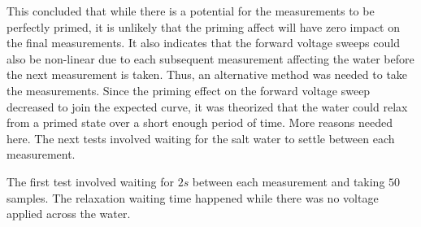 This concluded that while there is a potential for the measurements to be perfectly primed, it is unlikely that the priming affect will have zero impact on the final measurements.
It also indicates that the forward voltage sweeps could also be non-linear due to each subsequent measurement affecting the water before the next measurement is taken.
Thus, an alternative method was needed to take the measurements.    
Since the priming effect on the forward voltage sweep decreased to join the expected curve, it was theorized that the water could relax from a primed state over a short enough period of time.
More reasons needed here.
The next tests involved waiting for the salt water to settle between each measurement.

The first test involved waiting for $2s$ between each measurement and taking $50$ samples.
The relaxation waiting time happened while there was no voltage applied across the water.

